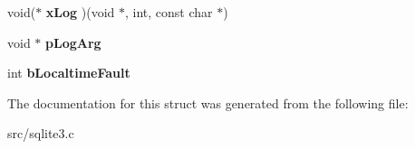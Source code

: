 \begin{DoxyCompactItemize}
\item 
\hypertarget{struct_sqlite3_config_a59bd59da6676dc62f9acdd6ff6d27d82}{void($\ast$ {\bfseries x\-Log} )(void $\ast$, int, const char $\ast$)}\label{struct_sqlite3_config_a59bd59da6676dc62f9acdd6ff6d27d82}

\item 
\hypertarget{struct_sqlite3_config_a501ab4552bc7c54bb413aced5889dcdc}{void $\ast$ {\bfseries p\-Log\-Arg}}\label{struct_sqlite3_config_a501ab4552bc7c54bb413aced5889dcdc}

\item 
\hypertarget{struct_sqlite3_config_a7bdc3109ecd839317f722b5da5339fab}{int {\bfseries b\-Localtime\-Fault}}\label{struct_sqlite3_config_a7bdc3109ecd839317f722b5da5339fab}

\end{DoxyCompactItemize}


The documentation for this struct was generated from the following file\-:\begin{DoxyCompactItemize}
\item 
src/sqlite3.\-c\end{DoxyCompactItemize}
